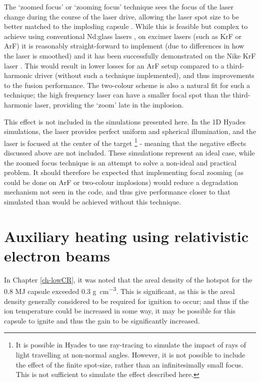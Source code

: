 The `zoomed focus' or `zooming focus' technique sees the focus of the laser change during the course of the laser drive, allowing the laser spot size to be better matched to the imploding capsule \cite{Kehne2013, Eimerl2014}. While this is feasible but complex to achieve using conventional Nd:glass lasers \cite{Obenschain2015}, on excimer lasers (such as KrF or ArF) it is reasonably straight-forward to implement (due to differences in how the laser is smoothed) and it has been successfully demonstrated on the Nike KrF laser \cite{Kehne2013}. This would result in lower losses for an ArF setup compared to a third-harmonic driver (without such a technique implemented), and thus improvements to the fusion performance. The two-colour scheme is also a natural fit for such a technique; the high frequency laser can have a smaller focal spot than the third-harmonic laser, providing the `zoom' late in the implosion.

This effect is not included in the simulations presented here. In the 1D Hyades simulations, the laser provides perfect uniform and spherical illumination, and the laser is focused at the center of the target \footnote{It is possible in Hyades to use ray-tracing to simulate the impact of rays of light travelling at non-normal angles. However, it is not possible to include the effect of the finite spot-size, rather than an infinitesimally small focus. This is not sufficient to simulate the effect described here.} - meaning that the negative effects discussed above are not included. These simulations represent an ideal case, while the zoomed focus technique is an attempt to solve a non-ideal and practical problem. It should therefore be expected that implementing focal zooming (as could be done on ArF or two-colour implosions) would reduce a degradation mechanism not seen in the code, and thus give performance closer to that simulated than would be achieved without this technique.

\section{Auxiliary heating using relativistic electron beams} \label{sec:AuxiliaryHeating}

In Chapter \ref{ch-lowCR}, it was noted that the areal density of the hotspot for the 0.8 MJ capsule exceeded 0.3 \unit{\gram\per\centi\meter\cubed}. This is significant, as this is the areal density generally considered to be required for ignition to occur; and thus if the ion temperature could be increased in some way, it may be possible for this capsule to ignite and thus the gain to be significantly increased.

